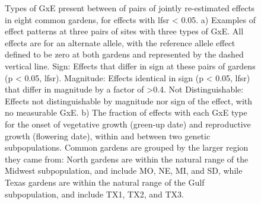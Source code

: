 \documentclass[
  9pt,
  twocolumn,
  twoside]{pnas-new}
\begin{document}
\begin{figure}


\caption{\label{fig-effects}Types of GxE present between of pairs of
jointly re-estimated effects in eight common gardens, for effects with
lfsr \textless{} 0.05. a) Examples of effect patterns at three pairs of
sites with three types of GxE. All effects are for an alternate allele,
with the reference allele effect defined to be zero at both gardens and
represented by the dashed vertical line. Sign: Effects that differ in
sign at these pairs of gardens (p \textless{} 0.05, lfsr). Magnitude:
Effects identical in sign (p \textless{} 0.05, lfsr) that differ in
magnitude by a factor of \textgreater0.4. Not Distinguishable: Effects
not distinguishable by magnitude nor sign of the effect, with no
measurable GxE. b) The fraction of effects with each GxE type for the
onset of vegetative growth (green-up date) and reproductive growth
(flowering date), within and between two genetic subpopulations. Common
gardens are grouped by the larger region they came from: North gardens
are within the natural range of the Midwest subpopulation, and include
MO, NE, MI, and SD, while Texas gardens are within the natural range of
the Gulf subpopulation, and include TX1, TX2, and TX3.}

\end{figure}%
\end{document}
